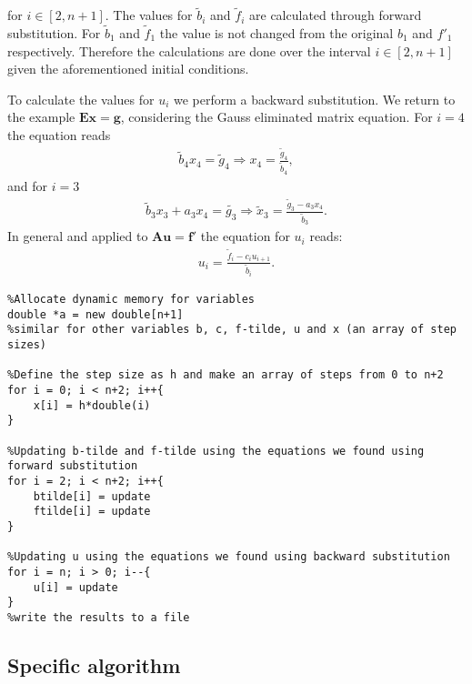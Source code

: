 \documentclass{emulateapj}
\begin{document}
for $i \in [2,n+1]$. The values for $\tilde{b}_i$ and $\tilde{f}_i$ are calculated through forward substitution. For $\tilde{b}_1$ and $\tilde{f}_1$ the value is not changed from the original $b_1$ and $f'_1$ respectively. Therefore the calculations are done over the interval $i \in [2,n+1]$ given the aforementioned initial conditions.

To calculate the values for $u_i$ we perform a backward substitution. We return to the example $\boldsymbol{E}\boldsymbol{x} = \boldsymbol{g}$, considering the Gauss eliminated matrix equation. For $i=4$ the equation reads
%
\begin{gather*}
    \tilde{b}_4 x_4 = \tilde{g}_4 \Rightarrow x_4 = \frac{\tilde{g}_4}{\tilde{b}_4},
\end{gather*}
%
and for $i=3$
%
\begin{gather*}
    \tilde{b}_3 x_3 + a_3 x_4 = \tilde{g_3} \Rightarrow \tilde{x}_3 = \frac{\tilde{g}_3 - a_3 x_4}{\tilde{b}_3}.
\end{gather*}
%
In general and applied to $\boldsymbol{A} \boldsymbol{u} = \boldsymbol{f'}$ the equation for $u_i$ reads:
%
\begin{gather}\label{eq:u_i}
    u_i = \frac{\tilde{f}_i - c_i u_{i+1}}{\tilde{b}_i}.
\end{gather}
%

\begin{lstlisting}
%Allocate dynamic memory for variables
double *a = new double[n+1]
%similar for other variables b, c, f-tilde, u and x (an array of step sizes)

%Define the step size as h and make an array of steps from 0 to n+2
for i = 0; i < n+2; i++{
    x[i] = h*double(i)
}

%Updating b-tilde and f-tilde using the equations we found using forward substitution
for i = 2; i < n+2; i++{
    btilde[i] = update
    ftilde[i] = update
}

%Updating u using the equations we found using backward substitution
for i = n; i > 0; i--{
    u[i] = update
}
%write the results to a file

\end{lstlisting}
%


\subsection{Specific algorithm}


%
\end{document}
